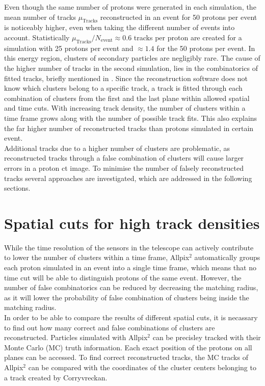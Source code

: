 Even though the same number of protons were generated in each simulation, the mean number of tracks $\mu_{\text{Tracks}}$ reconstructed in an event
for 50 protons per event is noticeably higher, even when taking the different number of events into account. Statistically
$\mu_{\text{Tracks}}/ N_{\text{event}} \approx 0.6$ tracks per proton are created for a simulation with 25 protons per event and $\approx 1.4$ for
the 50 protons per event. In this energy region, clusters of secondary particles are negligibly rare. The cause of the
higher number of tracks in the second simulation, lies in the combinatorics of fitted tracks, briefly mentioned in
\label{sec:proton_reconstruction}. Since the reconstruction software does not know which clusters belong to a specific track, a track
is fitted through each combination of clusters from the first and the last plane within allowed spatial and time cuts.
With increasing track density, the number
of clusters within a time frame grows along with the number of possible track fits.
This also explains the far higher number of reconstructed tracks than protons simulated in certain event. \\
Additional tracks due to a higher number of clusters are problematic, as reconstructed tracks through a false
combination of clusters will cause larger errors in a proton ct image. To minimise the number of falsely reconstructed tracks
several approaches are investigated, which are addressed in the following sections.

\section{Spatial cuts for high track densities} \label{sec:cuts}
While the time resolution of the sensors in the telescope can actively contribute to lower the number of clusters within a time frame,
Allpix$^2$ automatically groups each proton simulated in an event into a single time frame, which means that no time cut will be able
to distinguish protons of the same event. However, the number of false combinatorics can be reduced by decreasing the matching radius, as
it will lower the probability of false combination of clusters being inside the matching radius. \\
In order to be able to compare the results of different spatial cuts, it is necassary to find out how many correct and false combinations of clusters
are reconstructed. Particles simulated with Allpix$^2$ can be precisley tracked with their Monte Carlo (MC) truth information. Each exact
position of the protons on all planes can be accessed. To find correct reconstructed tracks, the MC tracks of Allpix$^2$ can be
compared with the coordinates of the cluster centers belonging to a track created by Corryvreckan. \\

